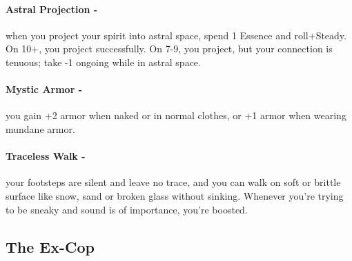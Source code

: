 \paragraph{Astral Projection -} when you project your spirit into astral space, spend 1 Essence and roll+Steady. On 10+, you project successfully. On 7-9, you project, but your connection is tenuous; take -1 ongoing while in astral space.

\paragraph{Mystic Armor -} you gain +2 armor when naked or in normal clothes, or +1 armor when wearing mundane armor.

\paragraph{Traceless Walk -} your footsteps are silent and leave no trace, and you can walk on soft or brittle surface like snow, sand or broken glass without sinking. Whenever you’re trying to be sneaky and sound is of importance, you’re boosted.



\clearpage
\subsection{The Ex-Cop}

